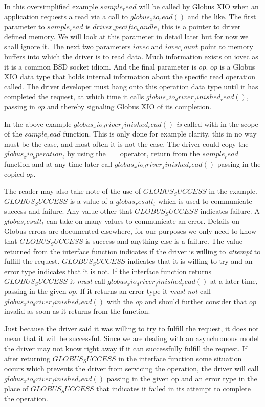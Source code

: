 \documentclass[11pt]{article}
\begin{document}
In this oversimplified example $sample_read$ will be called
by Globus XIO when an application requests a read via a call to
$globus_xio_read()$ and the like.  The first parameter to
$sample_read$ is $driver_specific_handle$, this is a pointer
to driver defined memory.  We will look at this parameter in detail
later but for now we shall ignore it.  The next two parameters 
$iovec$ and $iovec_count$ point to memory buffers into which
the driver is to read data.  Much information exists on iovec as it 
is a common BSD socket idiom.  And the final parameter is $op$.
$op$ is a Globus XIO data type that holds internal information about
the specific read operation called.  The driver developer must 
hang onto this operation data type until it has completed the request,
at which time it calls $globus_xio_driver_finished_read()$, passing
in $op$ and thereby signaling Globus XIO of its completion.

In the above example $globus_xio_driver_finished_read()$ \emph{is} called
with in the scope of the $sample_read$ function.  This is only done
for example clarity, this in no way must be the case, and most often
it is not the
case.  The driver could copy the $globus_xio_operation_t$ by using
the $=$ operator, return from the $sample_read$ function and at any time
later call $globus_xio_driver_finished_read()$ passing in the copied
$op$.

The reader may also take note of the use of $GLOBUS_SUCCESS$ in the example.
$GLOBUS_SUCCESS$ is a value of a $globus_result_t$ which is used to
communicate success and failure.  Any value other that $GLOBUS_SUCCESS$
indicates failure.  A $globus_result_t$ can take on many values to
communicate an error.  Details on Globus errors are documented 
elsewhere, for our purposes we only need to know that $GLOBUS_SUCCESS$ 
is success and anything else is a failure.
The value  returned from the interface function indicates
if the driver is willing to \emph{attempt} to fulfill the request.  
$GLOBUS_SUCCESS$ indicates that it is willing to try and an error
type indicates that it is not.  
If the interface function returns $GLOBUS_SUCCESS$
it \emph{must} call $globus_xio_driver_finished_read()$ at a later time, 
passing in the given $op$.  If it returns
an error type it \emph{must not} call $globus_xio_driver_finished_read()$
with the $op$ and should further consider that $op$ invalid as soon as it
returns from the function.

Just because the driver said it was willing to try to fulfill the
request, it does not mean that it will be successful.  Since we are
dealing with an asynchronous model the driver may not know right away
if it can successfully fulfill the request.  If after returning 
$GLOBUS_SUCCESS$ in the interface function some situation occurs 
which prevents the driver from servicing
the operation, the driver will call $globus_xio_driver_finished_read()$
passing in the given op and an error type in the place of $GLOBUS_SUCCESS$
that indicates it failed in its attempt to complete the operation.
\end{document}
